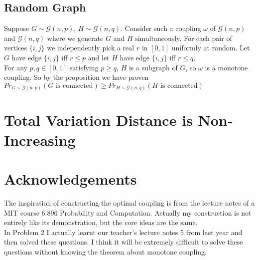 \documentclass[12pt,letterpaper]{article}
\begin{document}
\subsection{Random Graph}
Suppose $G\sim\mathcal{G}(n,p)$, $H\sim\mathcal{G}(n,q)$. Consider such a coupling $\omega$ of $\mathcal{G}(n,p)$ and $\mathcal{G}(n,q)$ where we generate $G$ and $H$ simultaneously. For each pair of vertices $\{i,j\}$ we independently pick a real $r$ in $[0,1]$ uniformly at random. Let $G$ have edge $\{i,j\}$ iff $r\leq p$ and let $H$ have edge $\{i,j\}$ iff $r\leq q$.\\ 
For any $p,q\in[0,1]$ satisfying $p\geq q$, $H$ is a subgraph of $G$, so $\omega$ is a monotone coupling. So by the proposition we have proven $Pr_{G\sim\mathcal{G}(n,p)}(G\text{ is connected})\geq Pr_{H\sim\mathcal{G}(n,q)}(H\text{ is connected})$

\newpage
\section{Total Variation Distance is Non-Increasing}


\section*{Acknowledgements}
The inspiration of constructing the optimal coupling is from the lecture notes of a MIT course 6.896 Probability and Computation. Actually my construction is not entirely like its demonstration, but the core ideas are the same.\\
In Problem 2 I actually learnt our teacher's lecture notes 5 from last year and then solved these questions. I think it will be extremely difficult to solve these questions without knowing the theorem about monotone coupling.
\end{document}
